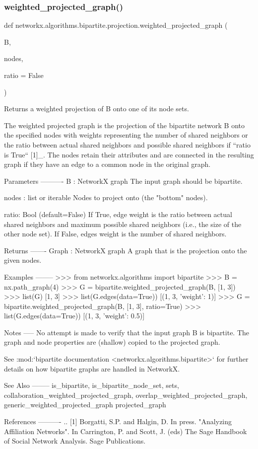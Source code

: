 \subsubsection{\texorpdfstring{weighted\+\_\+projected\+\_\+graph()}{weighted\_projected\_graph()}}
{\footnotesize\ttfamily def networkx.\+algorithms.\+bipartite.\+projection.\+weighted\+\_\+projected\+\_\+graph (\begin{DoxyParamCaption}\item[{}]{B,  }\item[{}]{nodes,  }\item[{}]{ratio = {\ttfamily False} }\end{DoxyParamCaption})}

\begin{DoxyVerb}Returns a weighted projection of B onto one of its node sets.

The weighted projected graph is the projection of the bipartite
network B onto the specified nodes with weights representing the
number of shared neighbors or the ratio between actual shared
neighbors and possible shared neighbors if ``ratio is True`` [1]_.
The nodes retain their attributes and are connected in the resulting
graph if they have an edge to a common node in the original graph.

Parameters
----------
B : NetworkX graph
    The input graph should be bipartite.

nodes : list or iterable
    Nodes to project onto (the "bottom" nodes).

ratio: Bool (default=False)
    If True, edge weight is the ratio between actual shared neighbors
    and maximum possible shared neighbors (i.e., the size of the other
    node set). If False, edges weight is the number of shared neighbors.

Returns
-------
Graph : NetworkX graph
   A graph that is the projection onto the given nodes.

Examples
--------
>>> from networkx.algorithms import bipartite
>>> B = nx.path_graph(4)
>>> G = bipartite.weighted_projected_graph(B, [1, 3])
>>> list(G)
[1, 3]
>>> list(G.edges(data=True))
[(1, 3, {'weight': 1})]
>>> G = bipartite.weighted_projected_graph(B, [1, 3], ratio=True)
>>> list(G.edges(data=True))
[(1, 3, {'weight': 0.5})]

Notes
-----
No attempt is made to verify that the input graph B is bipartite.
The graph and node properties are (shallow) copied to the projected graph.

See :mod:`bipartite documentation <networkx.algorithms.bipartite>`
for further details on how bipartite graphs are handled in NetworkX.

See Also
--------
is_bipartite,
is_bipartite_node_set,
sets,
collaboration_weighted_projected_graph,
overlap_weighted_projected_graph,
generic_weighted_projected_graph
projected_graph

References
----------
.. [1] Borgatti, S.P. and Halgin, D. In press. "Analyzing Affiliation
    Networks". In Carrington, P. and Scott, J. (eds) The Sage Handbook
    of Social Network Analysis. Sage Publications.
\end{DoxyVerb}
 